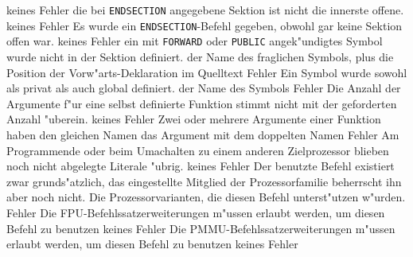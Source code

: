 \documentclass[12pt,a4paper,twoside]{report}
\newcommand{\tty}[1]{{\tt #1}}
\begin{document}
\begin{description}
               {keines}
               {Fehler}
               {die bei \tty{ENDSECTION} angegebene Sektion
	        ist nicht die innerste offene.}
               {keines}
               {Fehler}
               {Es wurde ein \tty{ENDSECTION}-Befehl gegeben, obwohl
                gar keine Sektion offen war.}
               {keines}
               {Fehler}
               {ein mit \tty{FORWARD} oder \tty{PUBLIC}
	        angek"undigtes Symbol wurde nicht in der Sektion definiert.}
               {der Name des fraglichen Symbols, plus die
                Position der Vorw"arts-Deklaration im Quelltext}
               {Fehler}
               {Ein Symbol wurde sowohl als privat als auch
                global definiert.}
               {der Name des Symbols}
               {Fehler}
               {Die Anzahl der Argumente f"ur eine
                selbst definierte Funktion stimmt nicht mit der geforderten
                Anzahl "uberein.}
               {keines}
               {Fehler}
               {Zwei oder mehrere Argumente einer Funktion haben den gleichen
                Namen}
               {das Argument mit dem doppelten Namen}
               {Fehler}
               {Am Programmende oder beim Umachalten
                zu einem anderen Zielprozessor blieben noch nicht
                abgelegte Literale "ubrig.}
               {keines}
               {Fehler}
               {Der benutzte Befehl existiert zwar
                grunds"atzlich, das eingestellte Mitglied der
                Prozessorfamilie beherrscht ihn aber noch nicht.}
               {Die Prozessorvarianten, die diesen Befehl
                unterst"utzen w"urden.}
               {Fehler}
               {Die FPU-Befehlssatzerweiterungen m"ussen erlaubt
                werden, um diesen Befehl zu benutzen}
               {keines}
               {Fehler}
               {Die PMMU-Befehlssatzerweiterungen m"ussen erlaubt
                werden, um diesen Befehl zu benutzen}
               {keines}
               {Fehler}

\end{description}
\end{document}
